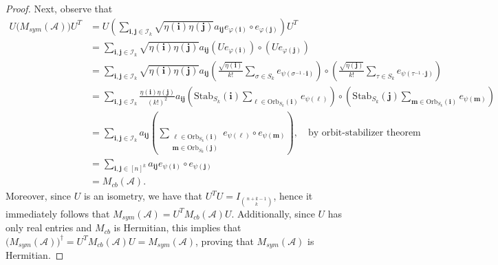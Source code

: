 \documentclass[11pt]{article}
\begin{document}
\begin{proof}
    Next, observe that 
    \begin{align*}
        U\big(M_{sym}(\mathcal{A})\big)U^T &= U\left(\sum\limits_{\mathbf{i},\mathbf{j}\in \mathcal{I}_k}\sqrt{\eta(\mathbf{i})\eta(\mathbf{j})}a_{\mathbf{i}\mathbf{j}}e_{\varphi(\mathbf{i})}\circ e_{\varphi(\mathbf{j})}\right)U^T \\
        &= \sum\limits_{\mathbf{i},\mathbf{j}\in \mathcal{I}_k}\sqrt{\eta(\mathbf{i})\eta(\mathbf{j})}a_{\mathbf{i}\mathbf{j}}(Ue_{\varphi(\mathbf{i})})\circ (Ue_{\varphi(\mathbf{j})}) \\
        &= \sum\limits_{\mathbf{i},\mathbf{j}\in \mathcal{I}_k}\sqrt{\eta(\mathbf{i})\eta(\mathbf{j})}a_{\mathbf{i}\mathbf{j}}\left(\frac{\sqrt{\eta(\mathbf{i})}}{k!}\sum\limits_{\sigma\in S_k}e_{\psi(\sigma^{-1}\cdot\mathbf{i})}\right)\circ \left(\frac{\sqrt{\eta(\mathbf{j})}}{k!}\sum\limits_{\tau\in S_k}e_{\psi(\tau^{-1}\cdot\mathbf{j})}\right) \\
        &= \sum\limits_{\mathbf{i},\mathbf{j}\in \mathcal{I}_k}\frac{\eta(\mathbf{i})\eta(\mathbf{j})}{(k!)^2}a_{\mathbf{i}\mathbf{j}}\left(\mathrm{Stab}_{S_k}(\mathbf{i})\sum\limits_{\boldsymbol{\ell}\in \mathrm{Orb}_{S_k}(\mathbf{i})}e_{\psi(\boldsymbol{\ell})}\right)\circ \left(\mathrm{Stab}_{S_k}(\mathbf{j})\sum\limits_{\mathbf{m}\in \mathrm{Orb}_{S_k}(\mathbf{i})}e_{\psi(\mathbf{m})}\right) \\
        &= \sum\limits_{\mathbf{i},\mathbf{j}\in\mathcal{I}_k}a_{\mathbf{i}\mathbf{j}}\left(\sum\limits_{\substack{\boldsymbol{\ell}\in \mathrm{Orb}_{S_k}(\mathbf{i}) \\ \mathbf{m}\in \mathrm{Orb}_{S_k}(\mathbf{j})}}e_{\psi(\boldsymbol{\ell})}\circ e_{\psi(\mathbf{m})}\right),\quad \text{by orbit-stabilizer theorem} \\
        &= \sum\limits_{\mathbf{i},\mathbf{j}\in [n]^k}a_{\mathbf{i}\mathbf{j}}e_{\psi(\mathbf{i})}\circ e_{\psi(\mathbf{j})} \\
        &= M_{cb}(\mathcal{A}).
    \end{align*}
    Moreover, since $U$ is an isometry, we have that $U^TU = I_{\binom{n+k-1}{k}}$, hence it immediately follows that $M_{sym}(\mathcal{A}) = U^TM_{cb}(\mathcal{A})U$. Additionally, since $U$ has only real entries and $M_{cb}$ is Hermitian, this implies that $\big(M_{sym}(\mathcal{A})\big)^{\dagger} = U^TM_{cb}(\mathcal{A})U = M_{sym}(\mathcal{A})$, proving that $M_{sym}(\mathcal{A})$ is Hermitian.  
\end{proof}
\end{document}
